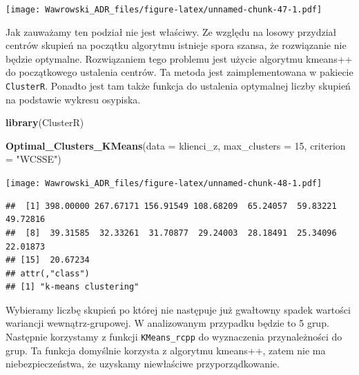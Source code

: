 \documentclass[]{book}
\newenvironment{Shaded}{\begin{snugshade}}{\end{snugshade}}
\newcommand{\DataTypeTok}[1]{\textcolor[rgb]{0.13,0.29,0.53}{#1}}
\newcommand{\DecValTok}[1]{\textcolor[rgb]{0.00,0.00,0.81}{#1}}
\newcommand{\KeywordTok}[1]{\textcolor[rgb]{0.13,0.29,0.53}{\textbf{#1}}}
\newcommand{\NormalTok}[1]{#1}
\newcommand{\OperatorTok}[1]{\textcolor[rgb]{0.81,0.36,0.00}{\textbf{#1}}}
\newcommand{\StringTok}[1]{\textcolor[rgb]{0.31,0.60,0.02}{#1}}
\begin{document}
\texttt{[image: Wawrowski\_ADR\_files/figure-latex/unnamed-chunk-47-1.pdf]}

Jak zauważamy ten podział nie jest właściwy. Ze względu na losowy przydział centrów skupień na początku algorytmu istnieje spora szansa, że rozwiązanie nie będzie optymalne. Rozwiązaniem tego problemu jest użycie algorytmu kmeans++ do początkowego ustalenia centrów. Ta metoda jest zaimplementowana w pakiecie \texttt{ClusterR}. Ponadto jest tam także funkcja do ustalenia optymalnej liczby skupień na podstawie wykresu osypiska.

\begin{Shaded}
\begin{Highlighting}[]
\KeywordTok{library}\NormalTok{(ClusterR)}

\KeywordTok{Optimal_Clusters_KMeans}\NormalTok{(}\DataTypeTok{data =}\NormalTok{ klienci_z, }\DataTypeTok{max_clusters =} \DecValTok{15}\NormalTok{, }\DataTypeTok{criterion =} \StringTok{"WCSSE"}\NormalTok{)}
\end{Highlighting}
\end{Shaded}

\texttt{[image: Wawrowski\_ADR\_files/figure-latex/unnamed-chunk-48-1.pdf]}

\begin{verbatim}
##  [1] 398.00000 267.67171 156.91549 108.68209  65.24057  59.83221  49.72816
##  [8]  39.31585  32.33261  31.70877  29.24003  28.18491  25.34096  22.01873
## [15]  20.67234
## attr(,"class")
## [1] "k-means clustering"
\end{verbatim}

Wybieramy liczbę skupień po której nie następuje już gwałtowny spadek wartości wariancji wewnątrz-grupowej. W analizowanym przypadku będzie to 5 grup. Następnie korzystamy z funkcji \texttt{KMeans\_rcpp} do wyznaczenia przynależności do grup. Ta funkcja domyślnie korzysta z algorytmu kmeans++, zatem nie ma niebezpieczeństwa, że uzyskamy niewłaściwe przyporządkowanie.

\begin{Shaded}
\end{Shaded}
\end{document}
